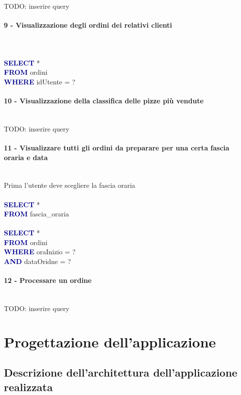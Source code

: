 \documentclass[a4paper,12pt, oneside]{article}
\begin{document}
TODO: inserire query

\paragraph{9 - Visualizzazione degli ordini dei relativi clienti}
\hphantom{A}\\    %
\\
\textcolor{darkBlue}{\textbf{SELECT}} *
\\\textcolor{darkBlue}{\textbf{FROM}} ordini
\\\textcolor{darkBlue}{\textbf{WHERE}} idUtente = ?

\paragraph{10 - Visualizzazione della classifica delle pizze più vendute}
\hphantom{A}\\    %
TODO: inserire query

\paragraph{11 - Visualizzare tutti gli ordini da preparare per una certa fascia oraria e data}
\hphantom{A}\\    %
Prima l'utente deve scegliere la fascia oraria
\\\\
\textcolor{darkBlue}{\textbf{SELECT}} *
\\\textcolor{darkBlue}{\textbf{FROM}} fascia\_oraria
\\\\
\textcolor{darkBlue}{\textbf{SELECT}} *
\\\textcolor{darkBlue}{\textbf{FROM}} ordini
\\\textcolor{darkBlue}{\textbf{WHERE}} oraInizio = ?
\\\textcolor{darkBlue}{\textbf{AND}} dataOridne = ?

\paragraph{12 - Processare un ordine}
\hphantom{A}\\    %
TODO: inserire query

\section{Progettazione dell'applicazione}
\subsection{Descrizione dell'architettura dell'applicazione realizzata}
\end{document}
